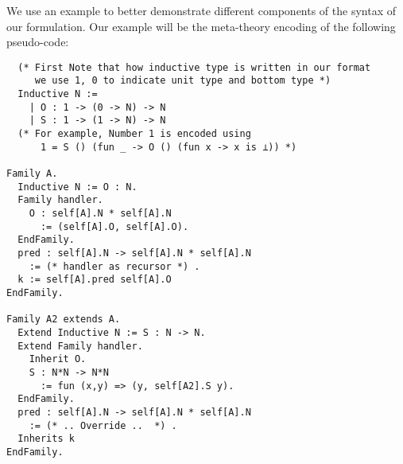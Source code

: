 We use an example to better demonstrate different components of the syntax of our formulation. Our example will be the meta-theory encoding of the following pseudo-code:

\begin{verbatim}
  (* First Note that how inductive type is written in our format
     we use 1, 0 to indicate unit type and bottom type *)
  Inductive N :=
    | O : 1 -> (0 -> N) -> N 
    | S : 1 -> (1 -> N) -> N
  (* For example, Number 1 is encoded using
      1 = S () (fun _ -> O () (fun x -> x is ⊥)) *)

Family A.
  Inductive N := O : N. 
  Family handler.
    O : self[A].N * self[A].N 
      := (self[A].O, self[A].O).
  EndFamily.
  pred : self[A].N -> self[A].N * self[A].N 
    := (* handler as recursor *) .
  k := self[A].pred self[A].O
EndFamily.

Family A2 extends A.
  Extend Inductive N := S : N -> N.
  Extend Family handler.
    Inherit O.
    S : N*N -> N*N 
      := fun (x,y) => (y, self[A2].S y).
  EndFamily.
  pred : self[A].N -> self[A].N * self[A].N 
    := (* .. Override ..  *) .
  Inherits k
EndFamily.
\end{verbatim}

